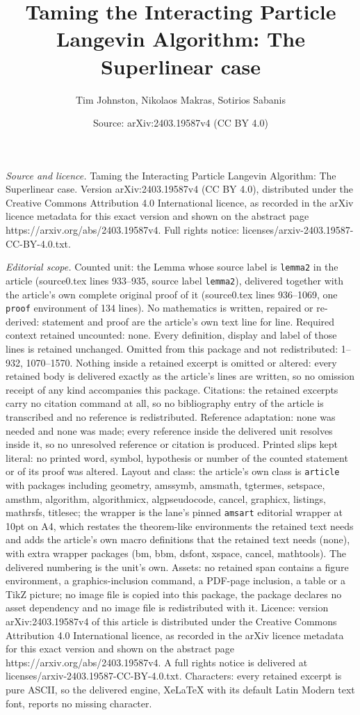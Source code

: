 \documentclass[10pt,a4paper]{amsart}
\title[Taming the Interacting Particle Langevin Algorithm: The Supe]{Taming the Interacting Particle Langevin Algorithm: The Superlinear case}
\author{Tim Johnston, Nikolaos Makras, Sotirios Sabanis}
\date{Source: arXiv:2403.19587v4 (CC BY 4.0)}
\begin{document}
\maketitle

\noindent\emph{Source and licence.} Taming the Interacting Particle Langevin Algorithm: The Superlinear case. Version arXiv:2403.19587v4 (CC BY 4.0), distributed under the Creative Commons Attribution 4.0 International licence, as recorded in the arXiv licence metadata for this exact version and shown on the abstract page https://arxiv.org/abs/2403.19587v4. Full rights notice: licenses/arxiv-2403.19587-CC-BY-4.0.txt.\par\smallskip

\noindent\textit{Editorial scope.} Counted unit: the Lemma whose source label is \texttt{lemma2} in the article (source0.tex lines 933--935, source label \texttt{lemma2}), delivered together with the article's own complete original proof of it (source0.tex lines 936--1069, one \texttt{proof} environment of 134 lines). No mathematics is written, repaired or re-derived: statement and proof are the article's own text line for line. Required context retained uncounted: none. Every definition, display and label of those lines is retained unchanged. Omitted from this package and not redistributed: 1--932, 1070--1570. Nothing inside a retained excerpt is omitted or altered: every retained body is delivered exactly as the article's lines are written, so no omission receipt of any kind accompanies this package. Citations: the retained excerpts carry no citation command at all, so no bibliography entry of the article is transcribed and no reference is redistributed. Reference adaptation: none was needed and none was made; every reference inside the delivered unit resolves inside it, so no unresolved reference or citation is produced. Printed slips kept literal: no printed word, symbol, hypothesis or number of the counted statement or of its proof was altered. Layout and class: the article's own class is \texttt{article} with packages including geometry, amssymb, amsmath, tgtermes, setspace, amsthm, algorithm, algorithmicx, algpseudocode, cancel, graphicx, listings, mathrsfs, titlesec; the wrapper is the lane's pinned \texttt{amsart} editorial wrapper at 10pt on A4, which restates the theorem-like environments the retained text needs and adds the article's own macro definitions that the retained text needs (none), with extra wrapper packages (bm, bbm, dsfont, xspace, cancel, mathtools). The delivered numbering is the unit's own. Assets: no retained span contains a figure environment, a graphics-inclusion command, a PDF-page inclusion, a table or a TikZ picture; no image file is copied into this package, the package declares no asset dependency and no image file is redistributed with it. Licence: version arXiv:2403.19587v4 of this article is distributed under the Creative Commons Attribution 4.0 International licence, as recorded in the arXiv licence metadata for this exact version and shown on the abstract page https://arxiv.org/abs/2403.19587v4. A full rights notice is delivered at licenses/arxiv-2403.19587-CC-BY-4.0.txt. Characters: every retained excerpt is pure ASCII, so the delivered engine, XeLaTeX with its default Latin Modern text font, reports no missing character.
\end{document}
